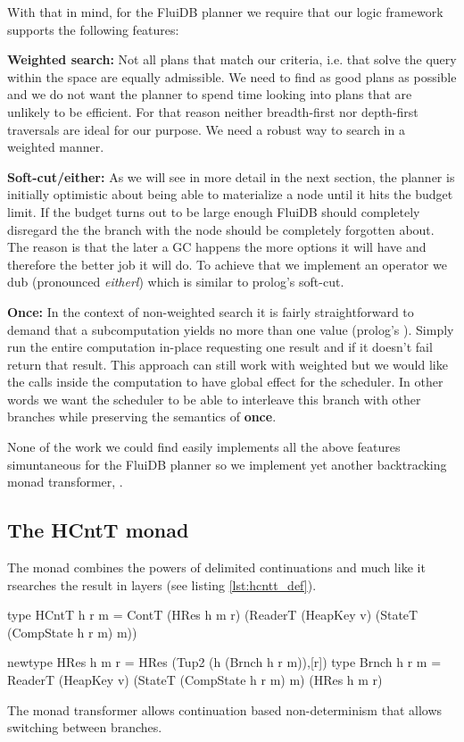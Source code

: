 With that in mind, for the FluiDB planner we require that our logic
framework supports the following features:

\textbf{Weighted search:} Not all plans that match our criteria, i.e. that
solve the query within the space are equally admissible. We need to
find as good plans as possible and we do not want the planner to spend
time looking into plans that are unlikely to be efficient. For that
reason neither breadth-first nor depth-first traversals are ideal for
our purpose. We need a robust way to search in a weighted manner.

\textbf{Soft-cut/either:} As we will see in more detail in the next section,
the planner is initially optimistic about being able to materialize a
node until it hits the budget limit. If the budget turns out to be
large enough FluiDB should completely disregard the the branch with
the node should be completely forgotten about. The reason is that the
later a GC happens the more options it will have and therefore the
better job it will do. To achieve that we implement an operator we dub
\hask{<//>} (pronounced \emph{eitherl}) which is similar to prolog's soft-cut.

\textbf{Once:} In the context of non-weighted search it is fairly
straightforward to demand that a subcomputation yields no more than
one value (prolog's ). Simply run the entire computation
in-place requesting one result and if it doesn't fail return that
result. This approach can still work with weighted but we would like
the  calls inside the computation to have global effect for the
scheduler. In other words we want the scheduler to be able to
interleave this branch with other branches while preserving the
semantics of \textbf{once}.

None of the work we could find easily implements all the above
features simuntaneous for the FluiDB planner so we implement yet
another backtracking monad transformer, .


\subsection{The HCntT monad}

The  monad combines the powers of delimited continuations and
much like \cite{kidneyAlgebrasWeightedSearch2021} it rsearches the
result in layers (see listing \ref{lst:hcntt_def}).

\begin{code}
\begin{haskellcode}
type HCntT h r m = ContT (HRes h m r)
  (ReaderT (HeapKey v)
   (StateT (CompState h r m) m))

newtype HRes h m r = HRes (Tup2 (h (Brnch h r m)),[r])
type Brnch h r m = ReaderT (HeapKey v)
  (StateT (CompState h r m) m) (HRes h m r)
\end{haskellcode}

  \caption{\label{lst:hcntt_def} The  monad transformer
    allows continuation based non-determinism that allows switching
    between branches.}
\end{code}

